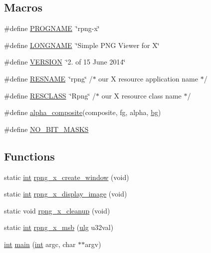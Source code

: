 \subsection*{Macros}
\begin{DoxyCompactItemize}
\item 
\#define \mbox{\hyperlink{rpng-x_8c_a8c9afb758de9a0355c93fc926b8ce6b1}{P\+R\+O\+G\+N\+A\+ME}}~\char`\"{}rpng-\/x\char`\"{}
\item 
\#define \mbox{\hyperlink{rpng-x_8c_ae8176192ea4d52bb0acbcfeaaffb3bd8}{L\+O\+N\+G\+N\+A\+ME}}~\char`\"{}Simple P\+NG Viewer for X\char`\"{}
\item 
\#define \mbox{\hyperlink{rpng-x_8c_a1c6d5de492ac61ad29aec7aa9a436bbf}{V\+E\+R\+S\+I\+ON}}~\char`\"{}2. of 15 June 2014\char`\"{}
\item 
\#define \mbox{\hyperlink{rpng-x_8c_a26d3cf6f35fd25b054ff41b03368b31b}{R\+E\+S\+N\+A\+ME}}~\char`\"{}rpng\char`\"{}        /$\ast$ our X resource application name $\ast$/
\item 
\#define \mbox{\hyperlink{rpng-x_8c_a3b0a2ac91fca697e3acedd9903efd4fd}{R\+E\+S\+C\+L\+A\+SS}}~\char`\"{}Rpng\char`\"{}        /$\ast$ our X resource class name $\ast$/
\item 
\#define \mbox{\hyperlink{rpng-x_8c_af1fe887e7346a25e71f3b1527e723692}{alpha\+\_\+composite}}(composite,  fg,  alpha,  \mbox{\hyperlink{rpng2-x_8c_a808fa6d3573a86afa3ba7698a65b1ef6}{bg}})
\item 
\#define \mbox{\hyperlink{rpng-x_8c_a17b2fe83e2965ffad1ae90c4283b3034}{N\+O\+\_\+B\+I\+T\+\_\+\+M\+A\+S\+KS}}
\end{DoxyCompactItemize}
\subsection*{Functions}
\begin{DoxyCompactItemize}
\item 
static \mbox{\hyperlink{ioapi_8h_a787fa3cf048117ba7123753c1e74fcd6}{int}} \mbox{\hyperlink{rpng-x_8c_aa0248c83cb58e449c3bfadfa665a5e3a}{rpng\+\_\+x\+\_\+create\+\_\+window}} (void)
\item 
static \mbox{\hyperlink{ioapi_8h_a787fa3cf048117ba7123753c1e74fcd6}{int}} \mbox{\hyperlink{rpng-x_8c_a764dae146d760f0ef544cde7191396ca}{rpng\+\_\+x\+\_\+display\+\_\+image}} (void)
\item 
static void \mbox{\hyperlink{rpng-x_8c_ac718542858c367c8ecb211043ca7d561}{rpng\+\_\+x\+\_\+cleanup}} (void)
\item 
static \mbox{\hyperlink{ioapi_8h_a787fa3cf048117ba7123753c1e74fcd6}{int}} \mbox{\hyperlink{rpng-x_8c_a1563bd7d4abbcd5bf81e60b05ca7a15b}{rpng\+\_\+x\+\_\+msb}} (\mbox{\hyperlink{readpng_8h_abd6f60bf9450af2ecb94097a32c19a64}{ulg}} u32val)
\item 
\mbox{\hyperlink{ioapi_8h_a787fa3cf048117ba7123753c1e74fcd6}{int}} \mbox{\hyperlink{rpng-x_8c_a3c04138a5bfe5d72780bb7e82a18e627}{main}} (\mbox{\hyperlink{ioapi_8h_a787fa3cf048117ba7123753c1e74fcd6}{int}} argc, char $\ast$$\ast$argv)
\end{DoxyCompactItemize}
